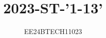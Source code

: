 \documentclass[journal,12pt,onecolumn]{IEEEtran}
\theoremstyle{remark}
\begin{document}

\vspace{3cm}

\title{2023-ST-'1-13'}
\author{EE24BTECH11023}
\maketitle

{\let\newpage\relax\maketitle}

\renewcommand{\thefigure}{\theenumi}
\renewcommand{\thetable}{\theenumi}
\setlength{\intextsep}{10pt} %

\renewcommand{\thetable}{\theenumi}
\end{document}
